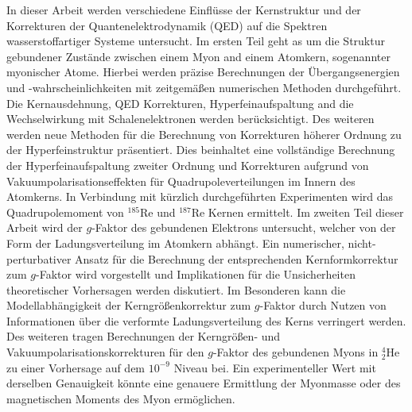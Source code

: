 
{\small
In dieser Arbeit werden verschiedene Einflüsse der Kernstruktur und der Korrekturen der Quantenelektrodynamik (QED) auf die Spektren wasserstoffartiger Systeme untersucht.
Im ersten Teil geht as um die Struktur gebundener Zustände zwischen einem Myon and einem Atomkern, sogenannter myonischer Atome.
Hierbei werden präzise Berechnungen der Übergangsenergien und -wahrscheinlichkeiten mit zeitgemäßen numerischen Methoden durchgeführt. Die Kernausdehnung, QED Korrekturen, Hyperfeinaufspaltung and die Wechselwirkung mit Schalenelektronen werden berücksichtigt. Des weiteren werden neue Methoden für die Berechnung von Korrekturen höherer Ordnung zu der Hyperfeinstruktur präsentiert. Dies beinhaltet eine vollständige Berechnung der Hyperfeinaufspaltung zweiter Ordnung und Korrekturen aufgrund von Vakuumpolarisationseffekten für Quadrupoleverteilungen im Innern des Atomkerns. 
In Verbindung mit kürzlich durchgeführten Experimenten wird das Quadrupolemoment von $^{185}$Re und $^{187}$Re Kernen ermittelt.
Im zweiten Teil dieser Arbeit wird der $g$-Faktor des gebundenen Elektrons untersucht, welcher von der Form der Ladungsverteilung im Atomkern abhängt. Ein numerischer, nicht-perturbativer Ansatz für die Berechnung der entsprechenden Kernformkorrektur zum $g$-Faktor wird vorgestellt und Implikationen für die Unsicherheiten theoretischer Vorhersagen werden diskutiert. Im Besonderen kann die Modellabhängigkeit der Kerngrößenkorrektur zum $g$-Faktor durch Nutzen von Informationen über die verformte Ladungsverteilung des Kerns verringert werden.
Des weiteren tragen Berechnungen der Kerngrößen- und Vakuumpolarisationskorrekturen für den $g$-Faktor des gebundenen Myons in $^{4}_2$He zu einer Vorhersage auf dem $10^{-9}$ Niveau bei. Ein experimenteller Wert mit derselben Genauigkeit könnte eine genauere Ermittlung der Myonmasse oder des magnetischen Moments des Myon ermöglichen.
}
